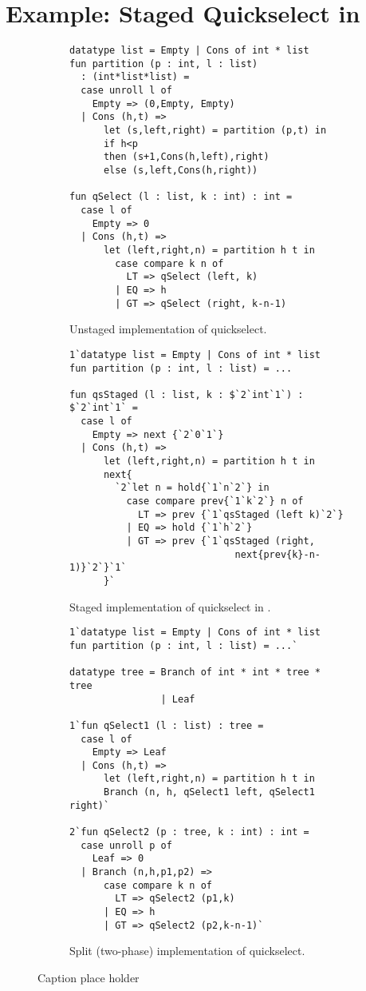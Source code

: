 \section {Example: Staged Quickselect in \texorpdfstring{\lang}{λ12}}
\label{sec:staging}

\begin{figure*}
\begin{subfigure}{0.5\textwidth}
\begin{lstlisting} 
datatype list = Empty | Cons of int * list
fun partition (p : int, l : list) 
  : (int*list*list) =
  case unroll l of 
    Empty => (0,Empty, Empty) 
  | Cons (h,t) =>
      let (s,left,right) = partition (p,t) in
      if h<p 
      then (s+1,Cons(h,left),right)
      else (s,left,Cons(h,right))

fun qSelect (l : list, k : int) : int = 
  case l of
    Empty => 0
  | Cons (h,t) => 
      let (left,right,n) = partition h t in
        case compare k n of
          LT => qSelect (left, k)
        | EQ => h
        | GT => qSelect (right, k-n-1)
\end{lstlisting}
\caption{Unstaged implementation of quickselect.}
\label{fig:quickselect}
\end{subfigure}%
\begin{subfigure}{0.5\textwidth}
\begin{lstlisting} 
1`datatype list = Empty | Cons of int * list
fun partition (p : int, l : list) = ...

fun qsStaged (l : list, k : $`2`int`1`) : $`2`int`1` = 
  case l of
    Empty => next {`2`0`1`}
  | Cons (h,t) => 
      let (left,right,n) = partition h t in
      next{
        `2`let n = hold{`1`n`2`} in
          case compare prev{`1`k`2`} n of
            LT => prev {`1`qsStaged (left k)`2`}
          | EQ => hold {`1`h`2`}
          | GT => prev {`1`qsStaged (right, 
                             next{prev{k}-n-1)}`2`}`1`
      }`
\end{lstlisting}
\caption{Staged implementation of quickselect in \lang.}
\label{fig:qsstaged}
\end{subfigure}
\begin{subfigure}{0.5\textwidth}
\begin{lstlisting}
1`datatype list = Empty | Cons of int * list
fun partition (p : int, l : list) = ...`
	
datatype tree = Branch of int * int * tree * tree
                | Leaf

1`fun qSelect1 (l : list) : tree =
  case l of
    Empty => Leaf
  | Cons (h,t) => 
      let (left,right,n) = partition h t in
      Branch (n, h, qSelect1 left, qSelect1 right)`

2`fun qSelect2 (p : tree, k : int) : int = 
  case unroll p of
    Leaf => 0
  | Branch (n,h,p1,p2) => 
      case compare k n of
        LT => qSelect2 (p1,k)
      | EQ => h
      | GT => qSelect2 (p2,k-n-1)`
\end{lstlisting}
\caption{Split (two-phase) implementation of quickselect.}
\label{fig:qssplit}
\end{subfigure}
\caption{Caption place holder}
\end{figure*}

